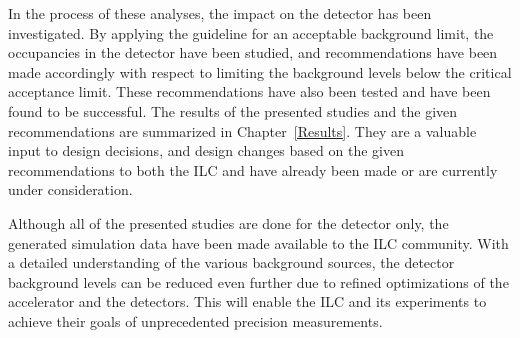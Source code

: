 In the process of these analyses, the impact on the \sid detector has been investigated.
By applying the \sid guideline for an acceptable background limit, the occupancies in the detector have been studied, and recommendations have been made accordingly with respect to limiting the background levels below the critical acceptance limit.
These recommendations have also been tested and have been found to be successful.
The results of the presented studies and the given recommendations are summarized in Chapter~\ref{Results}.
They are a valuable input to design decisions, and design changes based on the given recommendations to both the ILC and \sid have already been made or are currently under consideration.

Although all of the presented studies are done for the \sid detector only, the generated simulation data have been made available to the ILC community.
With a detailed understanding of the various background sources, the detector background levels can be reduced even further due to refined optimizations of the accelerator and the detectors.
This will enable the ILC and its experiments to achieve their goals of unprecedented precision measurements.